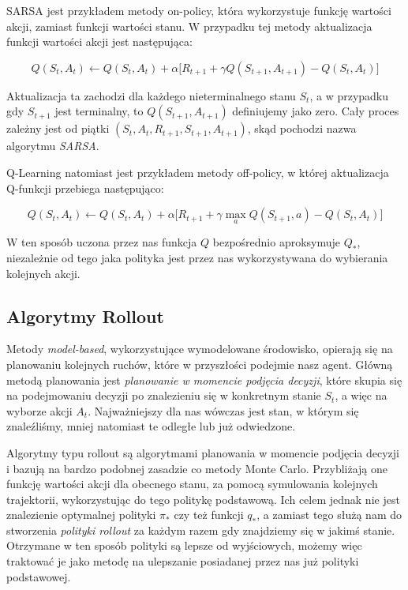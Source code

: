 \documentclass[licencjacka]{pracamgr}
\begin{document}
SARSA jest przykładem metody on-policy, która wykorzystuje funkcję wartości akcji, zamiast funkcji wartości stanu. W przypadku tej metody aktualizacja funkcji wartości akcji jest następująca:

$$ Q(S_t, A_t) \leftarrow Q(S_t, A_t) + \alpha \big[R_{t+1} + \gamma Q(S_{t+1}, A_{t+1}) - Q(S_t, A_t) \big] $$

Aktualizacja ta zachodzi dla każdego nieterminalnego stanu $S_t$, a w przypadku gdy $S_{t+1}$ jest terminalny, to $ Q(S_{t+1}, A_{t+1}) $ definiujemy jako zero. Cały proces zależny jest od piątki $ (S_t, A_t, R_{t+1}, S_{t+1}, A_{t+1}) $, skąd pochodzi nazwa algorytmu \emph{SARSA}.

Q-Learning natomiast jest przykładem metody off-policy, w której aktualizacja Q-funkcji przebiega następująco:

$$ Q(S_t, A_t) \leftarrow Q(S_t, A_t) + \alpha \big[R_{t+1} + \gamma \max_a Q(S_{t+1}, a) - Q(S_t, A_t) \big] $$

W ten sposób uczona przez nas funkcja $Q$ bezpośrednio aproksymuje $Q_\ast$, niezależnie od tego jaka polityka jest przez nas wykorzystywana do wybierania kolejnych akcji.

\subsection{Algorytmy Rollout}

Metody \emph{model-based}, wykorzystujące wymodelowane środowisko, opierają się na planowaniu kolejnych ruchów, które w przyszłości podejmie nasz agent. Główną metodą planowania jest \emph{planowanie w momencie podjęcia decyzji}, które skupia się na podejmowaniu decyzji po znalezieniu się w konkretnym stanie $S_t$, a więc na wyborze akcji $A_t$. Najważniejszy dla nas wówczas jest stan, w którym się znaleźliśmy, mniej natomiast te odległe lub już odwiedzone. 

Algorytmy typu rollout są algorytmami planowania w momencie podjęcia decyzji  i bazują na bardzo podobnej zasadzie co metody Monte Carlo. Przybliżają one funkcję wartości akcji dla obecnego stanu, za pomocą symulowania kolejnych trajektorii, wykorzystując do tego politykę podstawową. Ich celem jednak nie jest znalezienie optymalnej polityki $\pi_\ast$ czy też funkcji $q_\ast$, a zamiast tego służą nam do stworzenia \emph{polityki rollout} za każdym razem gdy znajdziemy się w jakimś stanie. Otrzymane w ten sposób polityki są lepsze od wyjściowych, możemy więc traktować je jako metodę na ulepszanie posiadanej przez nas już polityki podstawowej.
\end{document}
